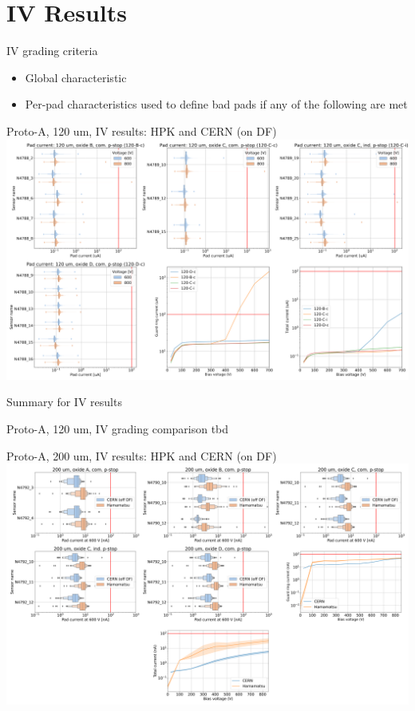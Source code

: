 \documentclass{beamer}
\begin{document}
\section{IV Results}

\begin{frame}{IV grading criteria}
   \begin{itemize}
       \item Global characteristic
       \item Per-pad characteristics used to define bad pads if any of the following are met
   \end{itemize}
    
\end{frame}


\begin{frame}{Proto-A, 120 um, IV results: HPK and CERN (on DF)}
  \includegraphics[width=.8\textwidth]{plots/IV_CERN_HPK_120um.png}
\end{frame}

\begin{frame}{Summary for IV results}
    
\end{frame}

\begin{frame}{Proto-A, 120 um, IV grading comparison}
  tbd
\end{frame}

\begin{frame}{Proto-A, 200 um, IV results: HPK and CERN (on DF)}
  \includegraphics[width=.8\textwidth]{plots/IV_Comparison_SensorsHPK_200um.png}
\end{frame}
\end{document}
